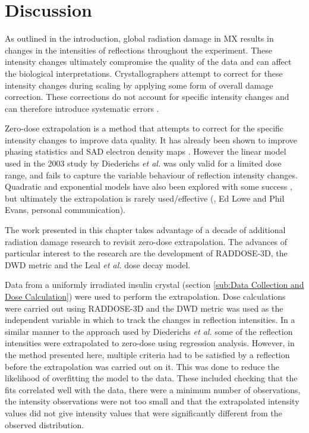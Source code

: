 \section{Discussion}
\label{sec:Discussion - Zero-dose extrapolation}
As outlined in the introduction, global radiation damage in MX results in changes in the intensities of reflections throughout the experiment.
These intensity changes ultimately compromise the quality of the data and can affect the biological interpretations.
Crystallographers attempt to correct for these intensity changes during scaling by applying some form of overall damage correction.
These corrections do not account for specific intensity changes and can therefore introduce systematic errors \cite{diederichs2003}.

Zero-dose extrapolation is a method that attempts to correct for the specific intensity changes to improve data quality.
It has already been shown to improve phasing statistics and SAD electron density maps \cite{diederichs2003}.
However the linear model used in the 2003 study by Diederichs \textit{et al.} was only valid for a limited dose range, and fails to capture the variable behaviour of reflection intensity changes.
Quadratic and exponential models have also been explored with some success \cite{diederichs2006}, but ultimately the extrapolation is rarely used/effective (\cite{borek2007many}, Ed Lowe and Phil Evans, personal communication).

The work presented in this chapter takes advantage of a decade of additional radiation damage research to revisit zero-dose extrapolation.
The advances of particular interest to the research are the development of RADDOSE-3D, the DWD metric and the Leal \textit{et al.}  dose decay model.

Data from a uniformly irradiated insulin crystal (section \ref{sub:Data Collection and Dose Calculation}) were used to perform the extrapolation.
Dose calculations were carried out using RADDOSE-3D and the DWD metric was used as the independent variable in which to track the changes in reflection intensities.
In a similar manner to the approach used by Diederichs \textit{et al.} some of the reflection intensities were extrapolated to zero-dose using regression analysis.
However, in the method presented here, multiple criteria had to be satisfied by a reflection before the extrapolation was carried out on it.
This was done to reduce the likelihood of overfitting the model to the data.
These included checking that the fits correlated well with the data, there were a minimum number of observations, the intensity observations were not too small and that the extrapolated intensity values did not give intensity values that were significantly different from the observed distribution.


